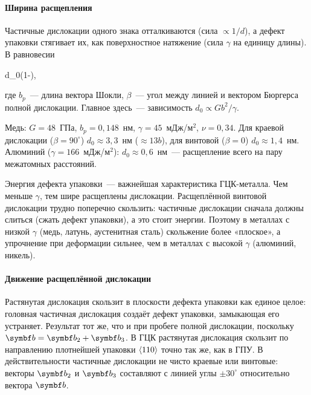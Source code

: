 \paragraph{Ширина расщепления}
Частичные дислокации одного знака отталкиваются (сила $\propto1/d$), а
дефект упаковки стягивает их, как поверхностное натяжение (сила $\gamma$
на единицу длины). В равновесии
\begin{keyeq}\label{eq:sf-width}
d_0\approx{}\cdot{}\left(1-\right),
\end{keyeq}
где $b_p$~— длина вектора Шокли, $\beta$~— угол между линией и вектором
Бюргерса полной дислокации. Главное здесь~— зависимость
$d_0\propto Gb^2/\gamma$.

\begin{primer}
Медь: $G=48$~ГПа, $b_p=0{,}148$~нм, $\gamma=45$~мДж/м$^2$, $\nu=0{,}34$.
Для краевой дислокации ($\beta=90^\circ$) $d_0\approx3{,}3$~нм ($\approx13b$),
для винтовой ($\beta=0$) $d_0\approx1{,}4$~нм. Алюминий ($\gamma=166$~мДж/м$^2$):
$d_0\approx0{,}6$~нм~— расщепление всего на пару межатомных расстояний.
\end{primer}

\begin{glavnoe}
Энергия дефекта упаковки~— важнейшая характеристика ГЦК-металла. Чем
меньше $\gamma$, тем шире расщеплены дислокации. Расщеплённой винтовой
дислокации трудно поперечно скользить: частичные дислокации сначала
должны слиться (сжать дефект упаковки), а это стоит энергии. Поэтому в
металлах с низкой $\gamma$ (медь, латунь, аустенитная сталь) скольжение
более «плоское», а упрочнение при деформации сильнее, чем в металлах с
высокой $\gamma$ (алюминий, никель).
\end{glavnoe}

\paragraph{Движение расщеплённой дислокации}
Растянутая дислокация скользит в плоскости дефекта упаковки как единое
целое: головная частичная дислокация создаёт дефект упаковки, замыкающая
его устраняет. Результат тот же, что и при пробеге полной дислокации,
поскольку $\vb b=\vb b_2+\vb b_3$. В ГЦК растянутая дислокация скользит
по направлению плотнейшей упаковки $\langle 110\rangle$ точно так же, как в ГПУ.
В действительности частичные дислокации не чисто краевые или винтовые:
векторы $\vb b_2$ и $\vb b_3$ составляют с линией углы $\pm30^\circ$
относительно вектора $\vb b$.

